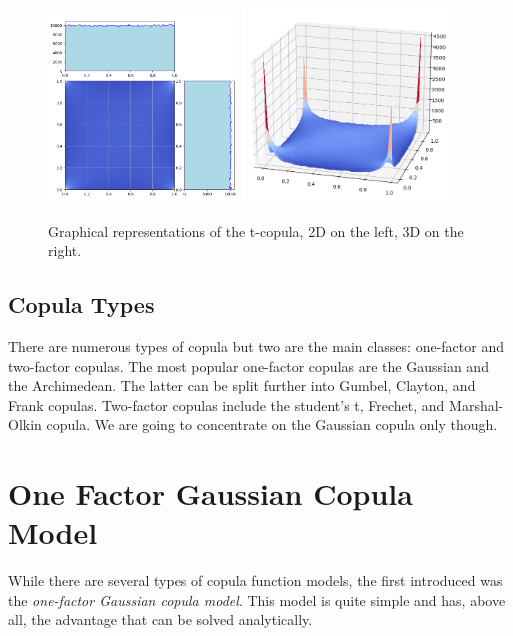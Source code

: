 \begin{figure}[htbp]
\centering
\includegraphics[width=0.45\textwidth]{figures/t-copula_2d}
\quad
\includegraphics[width=0.5\textwidth]{figures/t-copula_3d}
\caption{Graphical representations of the t-copula, 2D on the left, 3D on the right.}
\label{fig:t-copula}
\end{figure}

\subsection{Copula Types}
There are numerous types of copula but two are the main classes: one-factor and two-factor copulas.
The most popular one-factor copulas are the Gaussian and the Archimedean. The latter can be split further into Gumbel, Clayton, and Frank copulas.
Two-factor copulas include the student’s t, Frechet, and Marshal-Olkin copula. 
We are going to concentrate on the Gaussian copula only though.

\section{One Factor Gaussian Copula Model}
While there are several types of copula function models, the first introduced was the \emph{one-factor Gaussian copula model}. This model is quite simple and has, above all, the advantage that can be solved analytically. 

